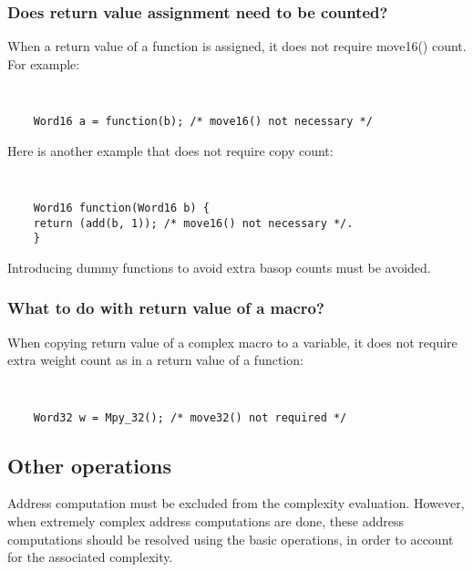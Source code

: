 \subsubsection{Does return value assignment need to be counted?}
When a return value of a function is assigned, it does not require
move16() count. For example:
{\tt\small
\begin{verbatim}
    Word16 a = function(b); /* move16() not necessary */
\end{verbatim}
}%
Here is another example that does not require copy count:
{\tt\small
\begin{verbatim}
    Word16 function(Word16 b) {
    return (add(b, 1)); /* move16() not necessary */.
    }
\end{verbatim}
}%

Introducing dummy functions to avoid extra basop
counts must be avoided. %
%

\subsubsection{What to do with return value of a macro?}
When copying return value of a complex macro to a variable, it does
not require extra weight count as in a return value of a function:
{\tt\small
\begin{verbatim}
    Word32 w = Mpy_32(); /* move32() not required */
\end{verbatim}
} %

\subsection{Other operations}

Address computation must be excluded from the complexity
evaluation. However, when extremely complex address computations
are done, these address computations should be resolved using the
basic operations, in order to account for the associated
complexity.

